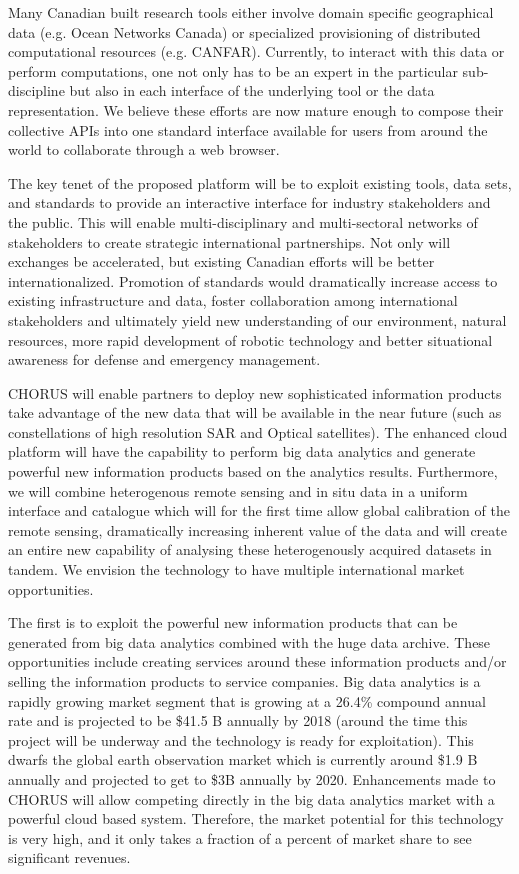 
Many Canadian built research tools either involve domain specific
geographical data (e.g. Ocean Networks Canada) or specialized
provisioning of distributed computational resources
(e.g. CANFAR). Currently, to interact with this data or perform
computations, one not only has to be an expert in the particular
sub-discipline but also in each interface of the underlying tool or
the data representation.  We believe these efforts are now mature
enough to compose their collective APIs into one standard interface
available for users from around the world to collaborate through a web
browser.

The key tenet of the proposed platform will be to exploit existing
tools, data sets, and standards to provide an interactive interface
for industry stakeholders and the public.  This will enable
multi-disciplinary and multi-sectoral networks of stakeholders to
create strategic international partnerships. Not only will exchanges
be accelerated, but existing Canadian efforts will be better
internationalized.  Promotion of standards would dramatically increase
access to existing infrastructure and data, foster collaboration among
international stakeholders and ultimately yield new understanding of
our environment, natural resources, more rapid development of robotic
technology and better situational awareness for defense and emergency
management.

CHORUS will enable partners to deploy new sophisticated information
products take advantage of the new data that will be available in the
near future (such as constellations of high resolution SAR and Optical
satellites).  The enhanced cloud platform will have the capability to
perform big data analytics and generate powerful new information
products based on the analytics results.  Furthermore, we will combine
heterogenous remote sensing and in situ data in a uniform interface
and catalogue which will for the first time allow global calibration
of the remote sensing, dramatically increasing inherent value of the
data and will create an entire new capability of analysing these
heterogenously acquired datasets in tandem.  We envision the technology
to have multiple international market opportunities.

The first is to exploit the powerful new information products that can
be generated from big data analytics combined with the huge data
archive. These opportunities include creating services around these
information products and/or selling the information products to
service companies.  Big data analytics is a rapidly growing market
segment that is growing at a 26.4\% compound annual rate and is
projected to be \$41.5 B annually by 2018 (around the time this project
will be underway and the technology is ready for exploitation). This
dwarfs the global earth observation market which is currently around
\$1.9 B annually and projected to get to \$3B annually by 2020.
Enhancements made to CHORUS will allow competing directly in the big
data analytics market with a powerful cloud based system. Therefore,
the market potential for this technology is very high, and it only
takes a fraction of a percent of market share to see significant
revenues.

